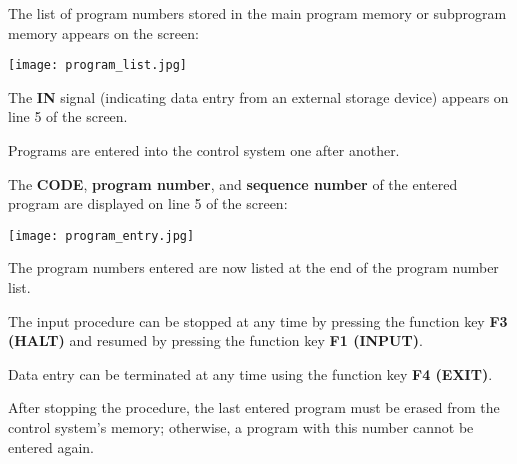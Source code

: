 The list of program numbers stored in the main program memory or subprogram memory appears on the screen:

\begin{center}
    \texttt{[image: program\_list.jpg]}
\end{center}

\begin{itemize}
\end{itemize}

\vspace{.5cm}

\begin{itemize}
\end{itemize}

\vspace{.5cm}

\begin{itemize}
\end{itemize}

The \textbf{IN} signal (indicating data entry from an external storage device) appears on line 5 of the screen.

Programs are entered into the control system one after another.

The \textbf{CODE}, \textbf{program number}, and \textbf{sequence number} of the entered program are displayed on line 5 of the screen:

\begin{center}
    \texttt{[image: program\_entry.jpg]}
\end{center}

\newpage

The program numbers entered are now listed at the end of the program number list.

\notes

The input procedure can be stopped at any time by pressing the function key \textbf{F3 (HALT)} and resumed by pressing the function key \textbf{F1 (INPUT)}.

Data entry can be terminated at any time using the function key \textbf{F4 (EXIT)}.

After stopping the procedure, the last entered program must be erased from the control system's memory; otherwise, a program with this number cannot be entered again.

